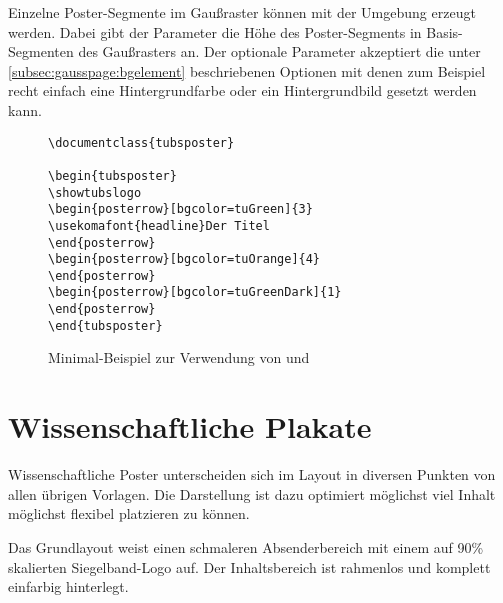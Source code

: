 Einzelne Poster-Segmente im Gaußraster können mit der Umgebung
 erzeugt werden.
Dabei gibt der Parameter  die Höhe des
Poster-Segments in Basis-Segmenten des Gaußrasters an.
Der optionale Parameter  akzeptiert die
unter \ref{subsec:gausspage:bgelement} beschriebenen Optionen mit
denen zum Beispiel recht einfach eine Hintergrundfarbe oder ein Hintergrundbild
gesetzt werden kann.

\begin{figure}[!ht]
\begin{minipage}{0.65\textwidth}
\begin{lstlisting}
\documentclass{tubsposter}

\begin{tubsposter}
\showtubslogo
\begin{posterrow}[bgcolor=tuGreen]{3}
\usekomafont{headline}Der Titel
\end{posterrow}
\begin{posterrow}[bgcolor=tuOrange]{4}
\end{posterrow}
\begin{posterrow}[bgcolor=tuGreenDark]{1}
\end{posterrow}
\end{tubsposter}

\end{lstlisting}
\end{minipage}
\begin{minipage}{0.35\textwidth}
\end{minipage}
\caption{Minimal-Beispiel zur Verwendung von  und
  }
\end{figure}


\clearpage
\section{Wissenschaftliche Plakate}

Wissenschaftliche Poster unterscheiden sich im Layout in diversen Punkten
von allen übrigen Vorlagen. Die Darstellung ist dazu optimiert möglichst
viel Inhalt möglichst flexibel platzieren zu können.

Das Grundlayout weist einen schmaleren Absenderbereich mit einem auf 90\%
skalierten Siegelband-Logo auf.
Der Inhaltsbereich ist rahmenlos und komplett einfarbig hinterlegt.

